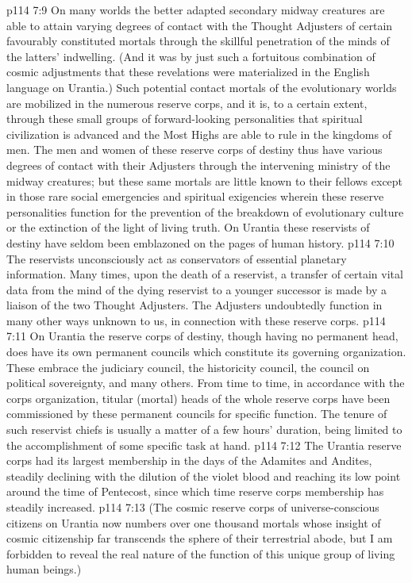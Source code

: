 \vs p114 7:9 On many worlds the better adapted secondary midway creatures are able to attain varying degrees of contact with the Thought Adjusters of certain favourably constituted mortals through the skillful penetration of the minds of the latters’ indwelling. (And it was by just such a fortuitous combination of cosmic adjustments that these revelations were materialized in the English language on Urantia.) Such potential contact mortals of the evolutionary worlds are mobilized in the numerous reserve corps, and it is, to a certain extent, through these small groups of forward\hyp{}looking personalities that spiritual civilization is advanced and the Most Highs are able to rule in the kingdoms of men. The men and women of these reserve corps of destiny thus have various degrees of contact with their Adjusters through the intervening ministry of the midway creatures; but these same mortals are little known to their fellows except in those rare social emergencies and spiritual exigencies wherein these reserve personalities function for the prevention of the breakdown of evolutionary culture or the extinction of the light of living truth. On Urantia these reservists of destiny have seldom been emblazoned on the pages of human history.
\vs p114 7:10 The reservists unconsciously act as conservators of essential planetary information. Many times, upon the death of a reservist, a transfer of certain vital data from the mind of the dying reservist to a younger successor is made by a liaison of the two Thought Adjusters. The Adjusters undoubtedly function in many other ways unknown to us, in connection with these reserve corps.
\vs p114 7:11 On Urantia the reserve corps of destiny, though having no permanent head, does have its own permanent councils which constitute its governing organization. These embrace the judiciary council, the historicity council, the council on political sovereignty, and many others. From time to time, in accordance with the corps organization, titular (mortal) heads of the whole reserve corps have been commissioned by these permanent councils for specific function. The tenure of such reservist chiefs is usually a matter of a few hours’ duration, being limited to the accomplishment of some specific task at hand.
\vs p114 7:12 The Urantia reserve corps had its largest membership in the days of the Adamites and Andites, steadily declining with the dilution of the violet blood and reaching its low point around the time of Pentecost, since which time reserve corps membership has steadily increased.
\vs p114 7:13 \pc (The cosmic reserve corps of universe\hyp{}conscious citizens on Urantia now numbers over one thousand mortals whose insight of cosmic citizenship far transcends the sphere of their terrestrial abode, but I am forbidden to reveal the real nature of the function of this unique group of living human beings.)
